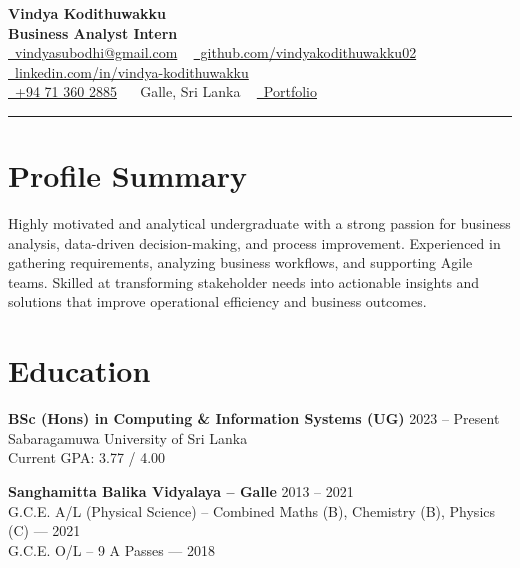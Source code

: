 \documentclass[letterpaper,12pt]{article}
\begin{document}
\fontsize{11}{13}\selectfont
\justifying

\begin{center}
{\Huge\color{accentTitle}\textbf{Vindya Kodithuwakku}}\\[3pt]
{\large\textbf{Business Analyst Intern}}\\[4pt]
\href{mailto:vindyasubodhi@gmail.com}{\faEnvelope~vindyasubodhi@gmail.com} ~
\href{https://github.com/vindyakodithuwakku02}{\faGithub~github.com/vindyakodithuwakku02} ~
\href{https://www.linkedin.com/in/vindya-kodithuwakku-bb6187202}{\faLinkedin~linkedin.com/in/vindya-kodithuwakku}\\[2pt]
\href{tel:+94713602885}{\faPhone~+94 71 360 2885} ~
\faMapMarker*~Galle, Sri Lanka ~
\href{https://vindyakodithuwakku02.github.io/my_portfolio/}{\faGlobe~Portfolio}\\[4pt]
{\color{accentLine}\hrule}
\end{center}
\fontsize{12}{13}\selectfont

\vspace{-20pt}
\section{Profile Summary}
\vspace{-2pt}
\justifying
Highly motivated and analytical undergraduate with a strong passion for business analysis, data-driven decision-making, and process improvement. Experienced in gathering requirements, analyzing business workflows, and supporting Agile teams. Skilled at transforming stakeholder needs into actionable insights and solutions that improve operational efficiency and business outcomes.

\section{Education}
\vspace{-1pt}

\textbf{BSc (Hons) in Computing \& Information Systems (UG)} \hfill 2023 – Present\\
Sabaragamuwa University of Sri Lanka\\
Current GPA: 3.77 / 4.00

\vspace{5pt}
\noindent\textbf{Sanghamitta Balika Vidyalaya – Galle} \hfill 2013 – 2021\\
G.C.E. A/L (Physical Science) – Combined Maths (B), Chemistry (B), Physics (C) — 2021\\
G.C.E. O/L – 9 A Passes — 2018
\end{document}
